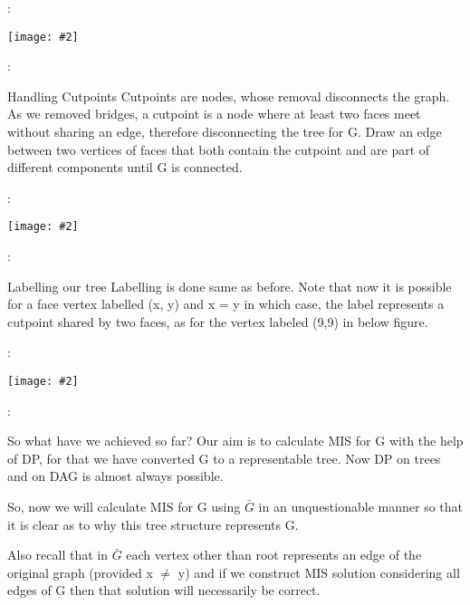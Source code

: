 \documentclass{beamer}
\newcommand{\iph}[2]{
    \texttt{[image: \#2]}
}
\begin{document}
\begin{frame}{\secname : \subsecname}
    \iph{0.9}{lin2}

\end{frame}

\begin{frame}{\secname : \subsecname}
    \begin{block}{Handling Cutpoints}
        Cutpoints are nodes,
whose removal disconnects the graph. As we removed bridges, a cutpoint
is a node where at least two faces meet without
sharing an edge, therefore disconnecting the tree for
G. Draw an edge between two vertices of faces that
both contain the cutpoint and are part of different
components until G is connected.
    \end{block}
\end{frame}

\begin{frame}{\secname : \subsecname}
    \iph{0.9}{lin3}

\end{frame}

\begin{frame}{\secname : \subsecname}
    \begin{block}{Labelling our tree}
        Labelling is done same as before. Note that now it is possible for a face vertex labelled (x, y) and x = y in which case, the label
        represents a cutpoint shared by two faces, as for the vertex labeled (9,9) in
        below figure.
    \end{block}

\end{frame}

\begin{frame}{\secname : \subsecname}
    \iph{0.9}{lin4}

\end{frame}

\begin{frame}{\secname : \subsecname}
    \begin{block}{So what have we achieved so far?}
        Our aim is to calculate MIS for G with the help of DP, for that we have converted G to a representable tree. Now DP on trees and on DAG is almost always possible. 
        
        So, now we will calculate MIS for G using $\bar{G}$ in an unquestionable manner so that it is clear as to why this tree structure represents G. 
        
        Also recall that in $\bar{G}$ each vertex other than root represents an edge of the original graph (provided x $\neq$ y) and if we construct MIS solution considering all edges of G then that solution will necessarily be correct.
    \end{block}
\end{frame}
\end{document}
